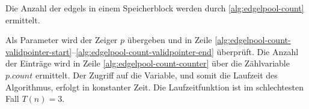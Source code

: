Die Anzahl der \glspl{edgel} in einem Speicherblock werden durch \autoref{alg:edgelpool-count} ermittelt.

Als Parameter wird der Zeiger $p$ übergeben und in Zeile
 \ref{alg:edgelpool-count-validpointer-start}--\ref{alg:edgelpool-count-validpointer-end} überprüft. Die Anzahl der
 Einträge wird in Zeile \ref{alg:edgelpool-count-counter} über die Zählvariable $\mathit{p.count}$ ermittelt. Der
 Zugriff auf die Variable, und somit die Laufzeit des Algorithmus, erfolgt in konstanter Zeit. Die Laufzeitfunktion ist
 im schlechtesten Fall $T(n) = 3$.

